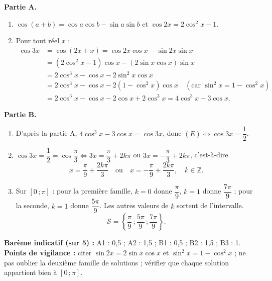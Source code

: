 \documentclass[11pt]{article}
\begin{document}
\begin{corrige}
\textbf{Partie A.}
\begin{enumerate}
\item $\cos(a+b) = \cos a\cos b - \sin a\sin b$ et $\cos 2x = 2\cos^2 x - 1$.
\item Pour tout réel $x$ :
\begin{align*}
\cos 3x &= \cos(2x+x) = \cos 2x \cos x - \sin 2x \sin x\\
&= (2\cos^2 x - 1)\cos x - (2\sin x\cos x)\sin x\\
&= 2\cos^3 x - \cos x - 2\sin^2 x \cos x\\
&= 2\cos^3 x - \cos x - 2(1-\cos^2 x)\cos x \quad (\text{car } \sin^2 x = 1 - \cos^2 x)\\
&= 2\cos^3 x - \cos x - 2\cos x + 2\cos^3 x = 4\cos^3 x - 3\cos x.
\end{align*}
\end{enumerate}
\textbf{Partie B.}
\begin{enumerate}
\item D'après la partie A, $4\cos^3 x - 3\cos x = \cos 3x$, donc $(E) \iff \cos 3x = \dfrac{1}{2}$.
\item $\cos 3x = \dfrac{1}{2} = \cos\dfrac{\pi}{3} \iff 3x = \dfrac{\pi}{3} + 2k\pi$ ou $3x = -\dfrac{\pi}{3} + 2k\pi$, c'est-à-dire
\[ x = \frac{\pi}{9} + \frac{2k\pi}{3} \quad\text{ou}\quad x = -\frac{\pi}{9} + \frac{2k\pi}{3}, \quad k\in\mathbb{Z}. \]
\item Sur $[0\,;\pi]$ : pour la première famille, $k=0$ donne $\dfrac{\pi}{9}$, $k=1$ donne $\dfrac{7\pi}{9}$ ; pour la seconde, $k=1$ donne $\dfrac{5\pi}{9}$. Les autres valeurs de $k$ sortent de l'intervalle.
\[ \mathcal{S} = \left\{\frac{\pi}{9}\,;\frac{5\pi}{9}\,;\frac{7\pi}{9}\right\}. \]
\end{enumerate}
\textbf{Barème indicatif (sur 5) :} A1 : 0,5 ; A2 : 1,5 ; B1 : 0,5 ; B2 : 1,5 ; B3 : 1.\\
\textbf{Points de vigilance :} citer $\sin 2x = 2\sin x\cos x$ et $\sin^2 x = 1-\cos^2 x$ ; ne pas oublier la deuxième famille de solutions ; vérifier que chaque solution appartient bien à $[0\,;\pi]$.
\end{corrige}
\end{document}
